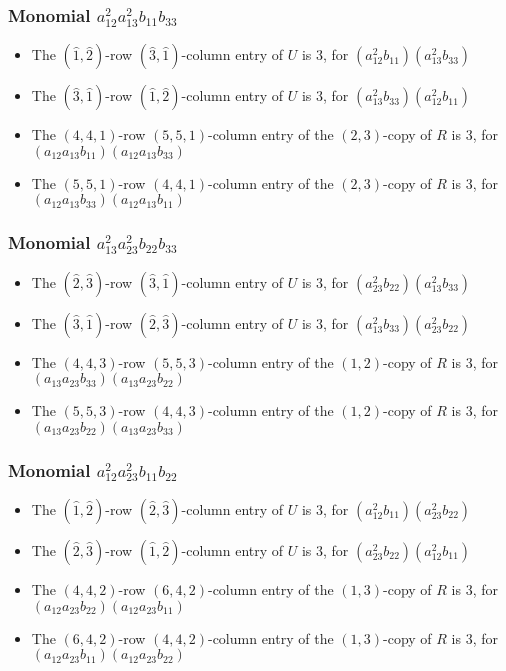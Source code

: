 \documentclass{article}
\begin{document}
\subsubsection{Monomial $ a_{12}^{2} a_{13}^{2} b_{11} b_{33} $}

\begin{itemize}
\item The $(\hat{1}, \hat{2})$-row $(\hat{3}, \hat{1})$-column entry of $U$ is $3$, for $( a_{12}^{2} b_{11} )( a_{13}^{2} b_{33} )$ 
\item The $(\hat{3}, \hat{1})$-row $(\hat{1}, \hat{2})$-column entry of $U$ is $3$, for $( a_{13}^{2} b_{33} )( a_{12}^{2} b_{11} )$ 
\item The $(4, 4, 1)$-row $(5, 5, 1)$-column entry of the $ \left(2, 3\right) $-copy of $R$ is $ 3 $, for $( a_{12} a_{13} b_{11} )( a_{12} a_{13} b_{33} )$ 
\item The $(5, 5, 1)$-row $(4, 4, 1)$-column entry of the $ \left(2, 3\right) $-copy of $R$ is $ 3 $, for $( a_{12} a_{13} b_{33} )( a_{12} a_{13} b_{11} )$ 
\end{itemize}
\subsubsection{Monomial $ a_{13}^{2} a_{23}^{2} b_{22} b_{33} $}

\begin{itemize}
\item The $(\hat{2}, \hat{3})$-row $(\hat{3}, \hat{1})$-column entry of $U$ is $3$, for $( a_{23}^{2} b_{22} )( a_{13}^{2} b_{33} )$ 
\item The $(\hat{3}, \hat{1})$-row $(\hat{2}, \hat{3})$-column entry of $U$ is $3$, for $( a_{13}^{2} b_{33} )( a_{23}^{2} b_{22} )$ 
\item The $(4, 4, 3)$-row $(5, 5, 3)$-column entry of the $ \left(1, 2\right) $-copy of $R$ is $ 3 $, for $( a_{13} a_{23} b_{33} )( a_{13} a_{23} b_{22} )$ 
\item The $(5, 5, 3)$-row $(4, 4, 3)$-column entry of the $ \left(1, 2\right) $-copy of $R$ is $ 3 $, for $( a_{13} a_{23} b_{22} )( a_{13} a_{23} b_{33} )$ 
\end{itemize}
\subsubsection{Monomial $ a_{12}^{2} a_{23}^{2} b_{11} b_{22} $}

\begin{itemize}
\item The $(\hat{1}, \hat{2})$-row $(\hat{2}, \hat{3})$-column entry of $U$ is $3$, for $( a_{12}^{2} b_{11} )( a_{23}^{2} b_{22} )$ 
\item The $(\hat{2}, \hat{3})$-row $(\hat{1}, \hat{2})$-column entry of $U$ is $3$, for $( a_{23}^{2} b_{22} )( a_{12}^{2} b_{11} )$ 
\item The $(4, 4, 2)$-row $(6, 4, 2)$-column entry of the $ \left(1, 3\right) $-copy of $R$ is $ 3 $, for $( a_{12} a_{23} b_{22} )( a_{12} a_{23} b_{11} )$ 
\item The $(6, 4, 2)$-row $(4, 4, 2)$-column entry of the $ \left(1, 3\right) $-copy of $R$ is $ 3 $, for $( a_{12} a_{23} b_{11} )( a_{12} a_{23} b_{22} )$ 
\end{itemize}
\end{document}
